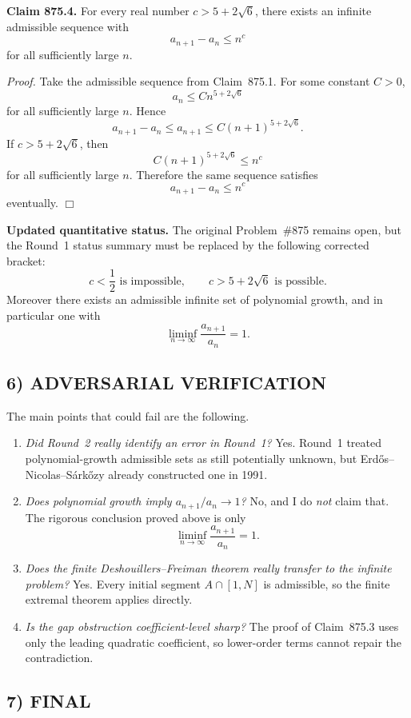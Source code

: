 \medskip
\noindent\textbf{Claim 875.4.}
For every real number \(c>5+2\sqrt 6\), there exists an infinite admissible sequence with
\[
a_{n+1}-a_n\le n^c
\]
for all sufficiently large \(n\).

\medskip
\noindent\emph{Proof.}
Take the admissible sequence from Claim~875.1. For some constant \(C>0\),
\[
a_n\le C n^{5+2\sqrt 6}
\]
for all sufficiently large \(n\). Hence
\[
a_{n+1}-a_n\le a_{n+1}\le C(n+1)^{5+2\sqrt 6}.
\]
If \(c>5+2\sqrt 6\), then
\[
C(n+1)^{5+2\sqrt 6}\le n^c
\]
for all sufficiently large \(n\). Therefore the same sequence satisfies
\[
a_{n+1}-a_n\le n^c
\]
eventually.
\hfill\(\Box\)

\medskip
\noindent\textbf{Updated quantitative status.}
The original Problem~\#875 remains open, but the Round~1 status summary must be replaced by the following corrected bracket:
\[
c<\frac12 \text{ is impossible},\qquad c>5+2\sqrt 6 \text{ is possible}.
\]
Moreover there exists an admissible infinite set of polynomial growth, and in particular one with
\[
\liminf_{n\to\infty}\frac{a_{n+1}}{a_n}=1.
\]

\subsection*{6) ADVERSARIAL VERIFICATION}

The main points that could fail are the following.

\begin{enumerate}
\item \emph{Did Round~2 really identify an error in Round~1?} Yes. Round~1 treated polynomial-growth admissible sets as still potentially unknown, but Erd\H{o}s--Nicolas--S\'ark\H{o}zy already constructed one in 1991.
\item \emph{Does polynomial growth imply \(a_{n+1}/a_n\to 1\)?} No, and I do \emph{not} claim that. The rigorous conclusion proved above is only
\[
\liminf_{n\to\infty}\frac{a_{n+1}}{a_n}=1.
\]
\item \emph{Does the finite Deshouillers--Freiman theorem really transfer to the infinite problem?} Yes. Every initial segment \(A\cap [1,N]\) is admissible, so the finite extremal theorem applies directly.
\item \emph{Is the gap obstruction coefficient-level sharp?} The proof of Claim~875.3 uses only the leading quadratic coefficient, so lower-order terms cannot repair the contradiction.
\end{enumerate}

\subsection*{7) FINAL}

